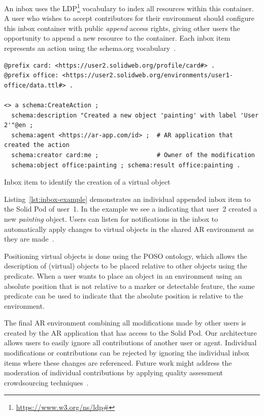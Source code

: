 An inbox uses the LDP\footnote{\url{https://www.w3.org/ns/ldp\#}} vocabulary to index all resources within this container. A user who wishes to accept contributors for their environment should configure this inbox container with public \textit{append} access rights, giving other users the opportunity to append a new resource to the container. Each inbox item represents an action using the \mbox{schema.org} vocabulary~\cite{10.1002/asi.24744}.

\begin{listing}[htb]
\begin{verbatim}
@prefix card: <https://user2.solidweb.org/profile/card#> .
@prefix office: <https://user2.solidweb.org/environments/user1-office/data.ttl#> .

<> a schema:CreateAction ;
  schema:description "Created a new object 'painting' with label 'User 2'"@en ;
  schema:agent <https://ar-app.com/id> ;  # AR application that created the action
  schema:creator card:me ;                # Owner of the modification
  schema:object office:painting ; schema:result office:painting .
\end{verbatim}
\caption{Inbox item to identify the creation of a virtual object} \label{lst:inbox-example}
\end{listing}

Listing~\ref{lst:inbox-example} demonstrates an individual appended inbox item to the Solid Pod of user~1. In the example we see a  indicating that user~2 created a new \textit{painting} object. Users can listen for notifications in the inbox to automatically apply changes to virtual objects in the shared AR environment as they are made~\cite{10.1007/978-3-319-58068-5_33}.

Positioning virtual objects is done using the POSO ontology, which allows the description of (virtual) objects to be placed relative to other objects using the  predicate. When a user wants to place an object in an environment using an absolute position that is not relative to a marker or detectable feature, the same predicate can be used to indicate that the absolute position is relative to the environment.

The final AR environment combining all modifications made by other users is created by the AR application that has access to the Solid Pod. Our architecture allows users to easily ignore all contributions of another user or agent. Individual modifications or contributions can be rejected by ignoring the individual inbox items where these changes are referenced. Future work might address the moderation of individual contributions by applying quality assessment crowdsourcing techniques~\cite{10.1007/978-3-642-41338-4_17}.

